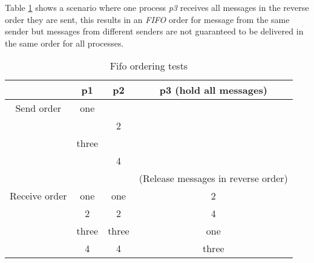 \documentclass[titlepage, twocolumn, a4paper, 10pt]{article}
\begin{document}
Table \ref{tbl:fifo} shows a scenario where one process \textit{p3}
receives all messages in the reverse order they are sent, this results
in an \textit{FIFO} order for message from the same sender but
messages from different senders are not guaranteed to be delivered in
the same order for all processes.

\begin{table}[H]
  \centering
  \begin{footnotesize}
    \begin{tabular} {c | c | c | c}
      & p1 & p2 & p3 (hold all messages) \\
      \hline
      Send order & one &  &  \\
      &  & 2 &  \\
      & three &  &  \\
      &  & 4 &  \\
      \hline
      &  &  & (Release messages in reverse order) \\
      \hline
      Receive order & one & one & 2 \\
      & 2 & 2 & 4 \\
      & three & three & one \\
      & 4 & 4 & three \\
   \end{tabular}
  \end{footnotesize}
  \caption{Fifo ordering tests}
  \label{tbl:fifo}
\end{table}
\begin{comment}
  #+ORGTBL: SEND fifo orgtbl-to-latex :splice t
  |               | p1    |    p2 | p3 (hold all messages)              |
  |---------------+-------+-------+-------------------------------------|
  | Send order    | one   |       |                                     |
  |               |       |     2 |                                     |
  |               | three |       |                                     |
  |               |       |     4 |                                     |
  |---------------+-------+-------+-------------------------------------|
  |               |       |       | (Release messages in reverse order) |
  |---------------+-------+-------+-------------------------------------|
  | Receive order | one   |   one | 2                                   |
  |               | 2     |     2 | 4                                   |
  |               | three | three | one                                 |
  |               | 4     |     4 | three                               |
\end{comment}
\end{document}
